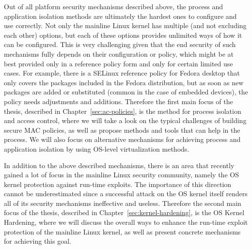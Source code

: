 Out of all platform security mechanisms described above, the process and application isolation methods are ultimately the hardest ones to configure and use correctly. Not only the mainline Linux kernel has multiple (and not excluding each other) options, but each of these options provides unlimited ways of how it can be configured. This is very challenging given that the end security of such mechanisms fully depends on their configuration or policy, which might be at best provided only in a reference policy form and only for certain limited use cases. For example, there is a SELinux reference policy for Fedora desktop that only covers the packages included in the Fedora distribution, but as soon as new packages are added or substituted (common in the case of embedded devices), the policy needs adjustments and additions. Therefore the first main focus of the thesis, described in Chapter~\ref{sec:ac-policies}, is the method for process isolation and access control, where we will take a look on the typical challenges of building secure MAC policies, as well as propose methods and tools that can help in the process. We will also focus on alternative mechanisms for achieving process and application isolation by using OS-level virtualization methods. 

In addition to the above described mechanisms, there is an area that recently gained a lot of focus in the mainline Linux security community, namely the OS kernel protection against run-time exploits. The importance of this direction cannot be underestimated since a successful attack on the OS kernel itself renders all of its security mechanisms ineffective and useless. Therefore the second main focus of the thesis, described in Chapter~\ref{sec:kernel-hardening}, is the OS Kernel Hardening, where we will discuss the overall ways to enhance the run-time exploit protection of the mainline Linux kernel, as well as present concrete mechanisms for achieving this goal. 
 